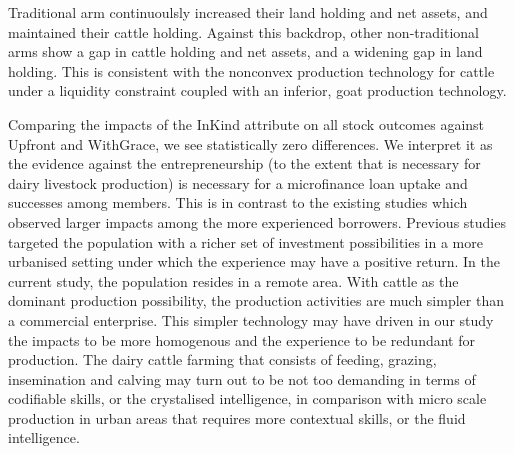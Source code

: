 	\textsf{Traditional} arm continuoulsly increased their land holding and net assets, and maintained their cattle holding. Against this backdrop, other non-\textsf{traditional} arms show a gap in cattle holding and net assets, and a widening gap in land holding. This is consistent with the nonconvex production technology for cattle under a liquidity constraint coupled with an inferior, goat production technology. 

	Comparing the impacts of the \textsf{InKind} attribute on all stock outcomes against \textsf{Upfront} and \textsf{WithGrace}, we see statistically zero differences. We interpret it as the evidence against the entrepreneurship (to the extent that is necessary for dairy livestock production) is necessary for a microfinance loan uptake and successes among members. This is in contrast to the existing studies which observed larger impacts among the more experienced borrowers. Previous studies targeted the population with a richer set of investment possibilities in a more urbanised setting under which the experience may have a positive return. In the current study, the population resides in a remote area. With cattle as the dominant production possibility, the production activities are much simpler than a commercial enterprise. This simpler technology may have driven in our study the impacts to be more homogenous and the experience to be redundant for production. The dairy cattle farming that consists of feeding, grazing, insemination and calving may turn out to be not too demanding in terms of codifiable skills, or the crystalised intelligence, in comparison with micro scale production in urban areas that requires more contextual skills, or the fluid intelligence. 

\begin{figure}
\end{figure}

